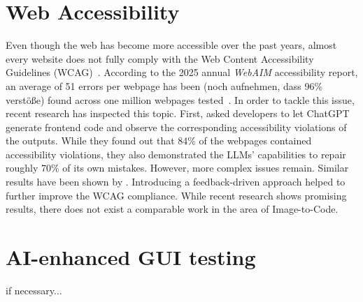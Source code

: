 \section{Web Accessibility}
Even though the web has become more accessible over the past years, almost every website 
does not fully comply with the Web Content Accessibility Guidelines 
(WCAG)~\parencite{wcag22}. According to the 2025 annual \textit{WebAIM}
accessibility report, an average of 51 errors per webpage has been (noch aufnehmen, dass 96\% verstöße) 
found across one million webpages tested~\parencite{webaim2025million}.
In order to tackle this issue, recent research has inspected this topic.
First, \textcite{aljedaani2024chatgpt}
asked developers to let ChatGPT generate frontend code and observe 
the corresponding accessibility violations of the outputs. While they 
found out that 84\% of the webpages contained accessibility violations,
they also demonstrated the LLMs' capabilities to repair roughly 
70\% of its own mistakes. However, more complex issues remain. 
Similar results have been shown by \textcite{suh2025accessiblecode}.
Introducing a feedback-driven approach helped to further improve 
the WCAG compliance.\newline
While recent research shows promising results, there does not exist 
a comparable work in the area of Image-to-Code. 


\section{AI-enhanced GUI testing}
if necessary...
